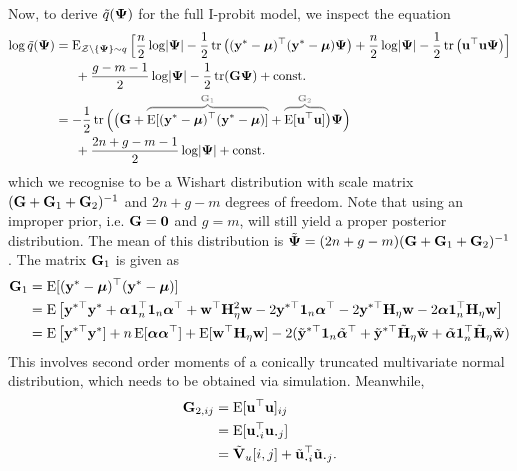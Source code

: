 Now, to derive $\tilde q({\bm\Psi})$ for the full I-probit model, we inspect the equation
\begin{align*}
  \log \tilde q(\bPsi)
  &= \E_{\cZ\backslash\{\bPsi\}\sim q} \Big[ 
  \half[n]\log\abs{\bPsi} - \half\tr \big((\by^* - \bmu)^\top (\by^* - \bmu)\bPsi  \big)
  + \half[n]\log\abs{\bPsi} - \half\tr \big( \bu^\top\bu\bPsi  \big)
  \Big] \\
  &\phantom{==} + \half[g-m-1]\log \abs{\bPsi} - \half\tr(\bG\bPsi) + \const \\
  &= -\half \tr \Big(
  \big(\bG + 
  \greyoverbrace{\E[(\by^* - \bmu)^\top (\by^* - \bmu)]}{\bG_1} +
  \greyoverbrace{\E[\bu^\top\bu]}{\bG_2}
  \big)\bPsi
  \Big) \\
  &\phantom{==} + \half[2n+g-m-1]\log \abs{\bPsi} + \const
\end{align*}
which we recognise to be a Wishart distribution with scale matrix $({\mathbf G} + {\mathbf G}_1 + {\mathbf G}_2)^{-1}$ and $2n+g-m$ degrees of freedom.
Note that using an improper prior, i.e. ${\mathbf G}={\mathbf 0}$ and $g=m$, will still yield a proper posterior distribution.
The mean of this distribution is $\tilde{{\bm\Psi}} = (2n+g-m)({\mathbf G} + {\mathbf G}_1 + {\mathbf G}_2)^{-1}$.
The matrix ${\mathbf G}_1$ is given as
\begin{align*}
  {\mathbf G}_1 
  &= \operatorname{E}[({\mathbf y}^* - {\bm\mu})^\top ({\mathbf y}^* - {\bm\mu})] \\
  &= \operatorname{E} \big[{\mathbf y}^{*\top}{\mathbf y}^* + {\bm\alpha}{\mathbf 1}_n^\top {\mathbf 1}_n{\bm\alpha}^\top + {\mathbf w}^\top{\mathbf H}_\eta^2{\mathbf w} -2{\mathbf y}^{*\top}{\mathbf 1}_n{\bm\alpha}^\top -2{\mathbf y}^{*\top}{\mathbf H}_\eta{\mathbf w} -2 {\bm\alpha}{\mathbf 1}_n^\top{\mathbf H}_\eta{\mathbf w} \big] \\
  &= \operatorname{E} \big[{\mathbf y}^{*\top}{\mathbf y}^*] + n\operatorname{E}[{\bm\alpha}{\bm\alpha}^\top] + \operatorname{E}[{\mathbf w}^\top{\mathbf H}_\eta{\mathbf w}] -2(\tilde{{\mathbf y}}^{*\top}{\mathbf 1}_n\tilde{{\bm\alpha}}^\top + \tilde{{\mathbf y}}^{*\top}\tilde{{\mathbf H}}_\eta\tilde{{\mathbf w}} + \tilde{{\bm\alpha}}{\mathbf 1}_n^\top\tilde{{\mathbf H}}_\eta\tilde{{\mathbf w}})
\end{align*}
This involves second order moments of a conically truncated multivariate normal distribution, which needs to be obtained via simulation.
Meanwhile,
\begin{align*}
  \bG_{2,ij}
  &= \E[\bu^\top\bu]_{ij} \\
  &= \E[\bu_{\bigcdot i}^\top \bu_{\bigcdot j}] \\
  &= \tilde\bV_u[i,j] + \tilde\bu_{\bigcdot i}^\top  \tilde\bu_{\bigcdot j}.
\end{align*}

